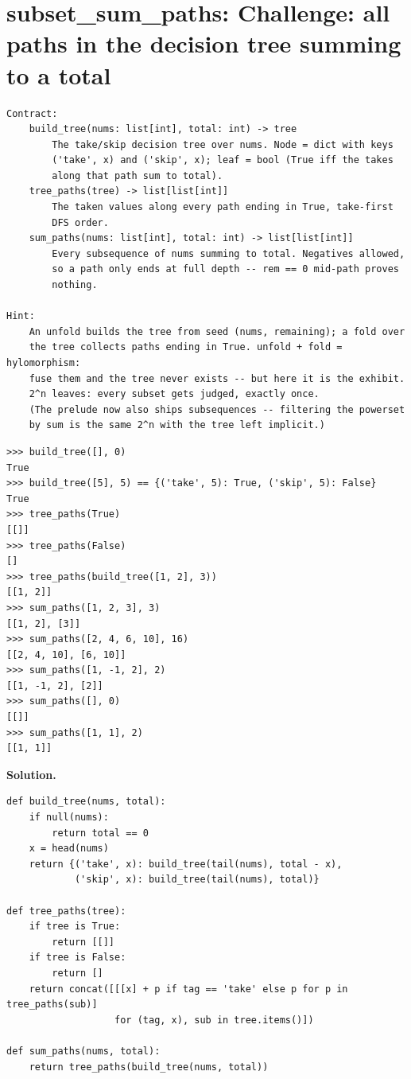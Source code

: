\documentclass[10pt,letterpaper]{book}
\begin{document}
\section{subset\_sum\_paths: Challenge: all paths in the decision tree summing to a total}
\begin{lstlisting}[style=ex]
Contract:
    build_tree(nums: list[int], total: int) -> tree
        The take/skip decision tree over nums. Node = dict with keys
        ('take', x) and ('skip', x); leaf = bool (True iff the takes
        along that path sum to total).
    tree_paths(tree) -> list[list[int]]
        The taken values along every path ending in True, take-first
        DFS order.
    sum_paths(nums: list[int], total: int) -> list[list[int]]
        Every subsequence of nums summing to total. Negatives allowed,
        so a path only ends at full depth -- rem == 0 mid-path proves
        nothing.

Hint:
    An unfold builds the tree from seed (nums, remaining); a fold over
    the tree collects paths ending in True. unfold + fold = hylomorphism:
    fuse them and the tree never exists -- but here it is the exhibit.
    2^n leaves: every subset gets judged, exactly once.
    (The prelude now also ships subsequences -- filtering the powerset
    by sum is the same 2^n with the tree left implicit.)
\end{lstlisting}
\begin{lstlisting}[style=ex]
>>> build_tree([], 0)
True
>>> build_tree([5], 5) == {('take', 5): True, ('skip', 5): False}
True
>>> tree_paths(True)
[[]]
>>> tree_paths(False)
[]
>>> tree_paths(build_tree([1, 2], 3))
[[1, 2]]
>>> sum_paths([1, 2, 3], 3)
[[1, 2], [3]]
>>> sum_paths([2, 4, 6, 10], 16)
[[2, 4, 10], [6, 10]]
>>> sum_paths([1, -1, 2], 2)
[[1, -1, 2], [2]]
>>> sum_paths([], 0)
[[]]
>>> sum_paths([1, 1], 2)
[[1, 1]]
\end{lstlisting}
\noindent\textbf{Solution.}
\begin{lstlisting}[style=code]
def build_tree(nums, total):
    if null(nums):
        return total == 0
    x = head(nums)
    return {('take', x): build_tree(tail(nums), total - x),
            ('skip', x): build_tree(tail(nums), total)}

def tree_paths(tree):
    if tree is True:
        return [[]]
    if tree is False:
        return []
    return concat([[[x] + p if tag == 'take' else p for p in tree_paths(sub)]
                   for (tag, x), sub in tree.items()])

def sum_paths(nums, total):
    return tree_paths(build_tree(nums, total))
\end{lstlisting}
\end{document}
